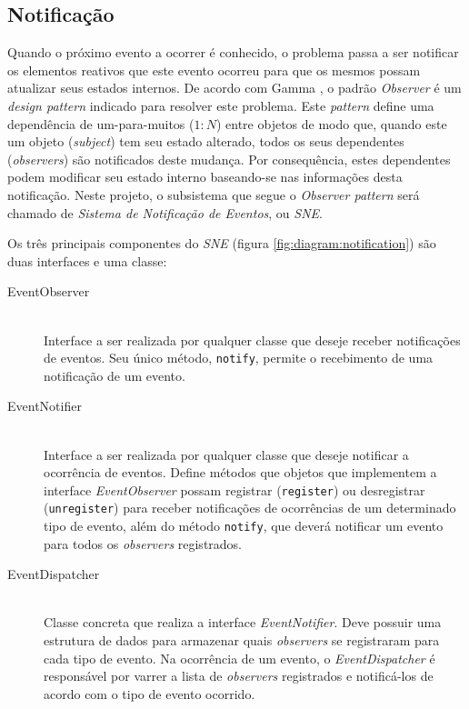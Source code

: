 \subsection{\label{sec:model:notify}Notificação}

Quando o próximo evento a ocorrer é conhecido, o problema passa a ser notificar
os elementos reativos que este evento ocorreu para que os mesmos possam
atualizar seus estados internos. De acordo com Gamma
\cite{Gamma:1995:DPE:186897}, o padrão \textit{Observer} é um \textit{design
pattern} indicado para resolver este problema. Este \textit{pattern} define uma
dependência de um-para-muitos ($1:N$) entre objetos de modo que, quando este um
objeto (\textit{subject}) tem seu estado alterado, todos os seus dependentes
(\textit{observers}) são notificados deste mudança. Por consequência, estes
dependentes podem modificar seu estado interno baseando-se nas informações desta
notificação. Neste projeto, o subsistema que segue o \textit{Observer pattern}
será chamado de \textit{Sistema de Notificação de Eventos}, ou \textit{SNE}.

Os três principais componentes do \textit{SNE} (figura
\ref{fig:diagram:notification}) são duas interfaces e uma classe:

\begin{description}
  \item[EventObserver] \hfill \\
    Interface a ser realizada por qualquer classe que deseje receber
    notificações de eventos. Seu único método, \texttt{notify}, permite o
    recebimento de uma notificação de um evento.

  \item[EventNotifier] \hfill \\
    Interface a ser realizada por qualquer classe que deseje notificar a
    ocorrência de eventos. Define métodos que objetos que implementem a
    interface \textit{EventObserver} possam registrar (\texttt{register}) ou
    desregistrar (\texttt{unregister}) para receber notificações de ocorrências
    de um determinado tipo de evento, além do método \texttt{notify}, que deverá
    notificar um evento para todos os \textit{observers} registrados.

\item[EventDispatcher] \hfill \\
    Classe concreta que realiza a interface \textit{EventNotifier}. Deve possuir
    uma estrutura de dados para armazenar quais \textit{observers} se
    registraram para cada tipo de evento. Na ocorrência de um evento, o
    \textit{EventDispatcher} é responsável por varrer a lista de
    \textit{observers} registrados e notificá-los de acordo com o tipo de evento
    ocorrido.

\end{description}

